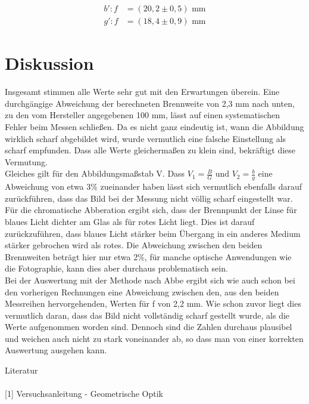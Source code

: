 \begin{align*}
b': f&=(20,2  \pm 0,5) \text{ mm}\\
g': f&=(18,4  \pm 0,9) \text{ mm}
\end{align*}

\section{Diskussion}
Insgesamt stimmen alle Werte sehr gut mit den Erwartungen überein. Eine durchgängige Abweichung der berechneten Brennweite von 2,3 mm nach unten, zu den vom Hersteller angegebenen 100 mm, lässt auf einen systematischen Fehler beim Messen schließen. Da es nicht ganz eindeutig ist, wann die Abbildung wirklich scharf abgebildet wird, wurde vermutlich eine falsche Einstellung als scharf empfunden. Dass alle Werte gleichermaßen zu klein sind, bekräftigt diese Vermutung.\\
Gleiches gilt für den Abbildungsmaßstab V. Dass $V_1 = \frac{B}{G}$ und $V_2 = \frac{b}{g}$ eine Abweichung von etwa 3\% zueinander haben lässt sich vermutlich ebenfalls darauf zurückführen, dass das Bild bei der Messung nicht völlig scharf eingestellt war.\\
Für die chromatische Abberation ergibt sich, dass der Brennpunkt der Linse für blaues Licht dichter am Glas als für rotes Licht liegt. Dies ist darauf zurückzuführen, dass blaues Licht stärker beim Übergang in ein anderes Medium stärker gebrochen wird als rotes. Die Abweichung zwischen den beiden Brennweiten beträgt hier nur etwa 2\%, für manche optische Anwendungen wie die Fotographie, kann dies aber durchaus problematisch sein.\\
Bei der Auswertung mit der Methode nach Abbe ergibt sich wie auch schon bei den vorherigen Rechnungen eine Abweichung zwischen den, aus den beiden Messreihen hervorgehenden, Werten für f von 2,2 mm. Wie schon zuvor liegt dies vermutlich daran, dass das Bild nicht vollständig scharf gestellt wurde, als die Werte aufgenommen worden sind. Dennoch sind die Zahlen durchaus plausibel und weichen auch nicht zu stark voneinander ab, so dass man von einer korrekten Auswertung ausgehen kann.

\parskip 220pt
\Large{Literatur}\\\\
\large{[1] Versuchsanleitung - Geometrische Optik}




